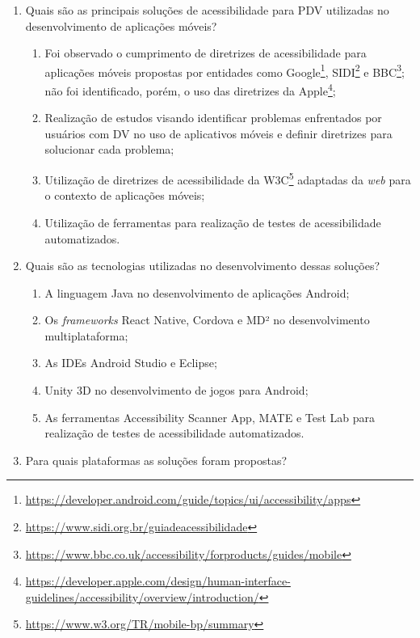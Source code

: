 \begin{enumerate}
      \item Quais são as principais soluções de acessibilidade para PDV utilizadas
            no desenvolvimento de aplicações móveis?
            \begin{enumerate}
                  \item Foi observado o cumprimento de diretrizes de acessibilidade para aplicações móveis propostas por entidades
                        como Google\footnote{\url{https://developer.android.com/guide/topics/ui/accessibility/apps}},
                        SIDI\footnote{\url{https://www.sidi.org.br/guiadeacessibilidade}} e
                        BBC\footnote{\url{https://www.bbc.co.uk/accessibility/forproducts/guides/mobile}}; não foi identificado, porém, o uso das diretrizes da
                        Apple\footnote{\url{https://developer.apple.com/design/human-interface-guidelines/accessibility/overview/introduction/}};
                  \item Realização de estudos visando identificar problemas enfrentados por usuários com DV no uso de aplicativos móveis e definir diretrizes para solucionar cada problema;
                  \item Utilização de diretrizes de acessibilidade da W3C\footnote{\url{https://www.w3.org/TR/mobile-bp/summary}} adaptadas da \emph{web} para o contexto de aplicações móveis;
                  \item Utilização de ferramentas para realização de testes de acessibilidade automatizados.
            \end{enumerate}
      \item Quais são as tecnologias utilizadas no desenvolvimento dessas soluções?
            \begin{enumerate}
                  \item A linguagem Java no desenvolvimento de aplicações Android;
                  \item Os \emph{frameworks} React Native, Cordova e MD² no desenvolvimento multiplataforma;
                  \item As IDEs Android Studio e Eclipse;
                  \item Unity 3D no desenvolvimento de jogos para Android;
                  \item As ferramentas Accessibility Scanner App, MATE e Test Lab para realização de testes de acessibilidade automatizados.
            \end{enumerate}
      \item Para quais plataformas as soluções foram propostas?

\end{enumerate}
